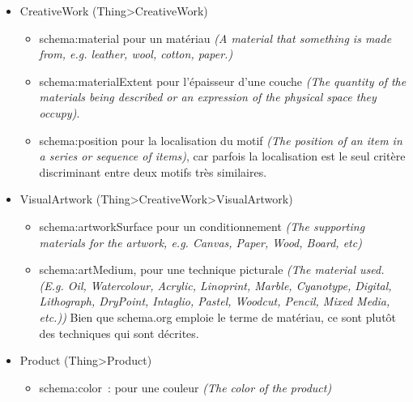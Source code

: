 \documentclass[a4paper,12pt, twoside]{book}
\begin{document}
\begin{itemize}
    \item \textsf{CreativeWork (Thing>CreativeWork)}\\

    \begin{itemize}
        \item \textsf{schema:material} pour un matériau \textit{(A material that something is made from, e.g. leather, wool, cotton, paper.)}\\

        \item \textsf{schema:materialExtent} pour l’épaisseur d’une couche \textit{(The quantity of the materials being described or an expression of the physical space they occupy)}.\\

        \item \textsf{schema:position} pour la localisation du motif \textit{(The position of an item in a series or sequence of items)}, car parfois la localisation est le seul critère discriminant entre deux motifs très similaires.\\
    \end{itemize}

\item \textsf{VisualArtwork (Thing>CreativeWork>VisualArtwork)}\\

    \begin{itemize}
        \item \textsf{schema:artworkSurface} pour un conditionnement \textit{(The supporting materials for the artwork, e.g. Canvas, Paper, Wood, Board, etc)}\\

        \item \textsf{schema:artMedium}, pour une technique picturale \textit{(The material used. (E.g. Oil, Watercolour, Acrylic, Linoprint, Marble, Cyanotype, Digital, Lithograph, DryPoint, Intaglio, Pastel, Woodcut, Pencil, Mixed Media, etc.))} Bien que schema.org emploie le terme de matériau, ce sont plutôt des techniques qui sont décrites.\\
    \end{itemize}

\item \textsf{Product (Thing>Product)}\\

    \begin{itemize}
        \item \textsf{schema:color}~: pour une couleur \textit{(The color of the product)}\\


\end{itemize}
\end{itemize}
\end{document}
